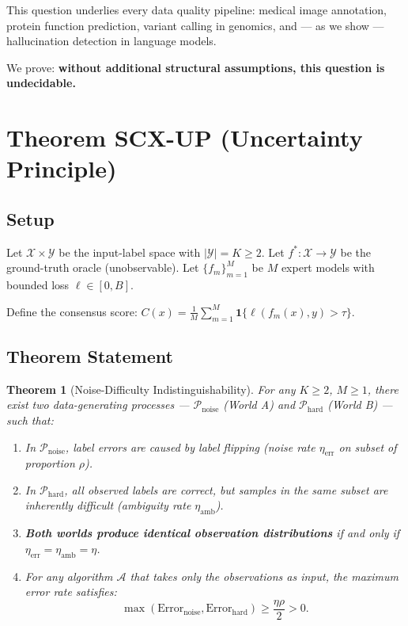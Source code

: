 \documentclass[12pt,a4paper]{ctexart}
\newtheorem{theorem}{Theorem}[section]
\theoremstyle{definition}
\theoremstyle{remark}
\begin{document}
This question underlies every data quality pipeline: medical image annotation, protein function prediction, variant calling in genomics, and — as we show — hallucination detection in language models.

We prove: \textbf{without additional structural assumptions, this question is undecidable.}

\section{Theorem SCX-UP (Uncertainty Principle)}

\subsection{Setup}

Let $\mathcal{X} \times \mathcal{Y}$ be the input-label space with $|\mathcal{Y}| = K \geq 2$. Let $f^*: \mathcal{X} \to \mathcal{Y}$ be the ground-truth oracle (unobservable). Let $\{f_m\}_{m=1}^M$ be $M$ expert models with bounded loss $\ell \in [0, B]$.

Define the consensus score: $C(x) = \frac{1}{M} \sum_{m=1}^M \mathbf{1}\{\ell(f_m(x), y) > \tau\}$.

\subsection{Theorem Statement}

\begin{theorem}[Noise-Difficulty Indistinguishability]
\label{thm:scx-up}
For any $K \geq 2$, $M \geq 1$, there exist two data-generating processes — $\mathcal{P}_{\text{noise}}$ (World A) and $\mathcal{P}_{\text{hard}}$ (World B) — such that:
\begin{enumerate}
\item In $\mathcal{P}_{\text{noise}}$, label errors are caused by label flipping (noise rate $\eta_{\text{err}}$ on subset of proportion $\rho$).
\item In $\mathcal{P}_{\text{hard}}$, all observed labels are correct, but samples in the same subset are inherently difficult (ambiguity rate $\eta_{\text{amb}}$).
\item \textbf{Both worlds produce identical observation distributions} if and only if $\eta_{\text{err}} = \eta_{\text{amb}} = \eta$.
\item For any algorithm $\mathcal{A}$ that takes only the observations as input, the maximum error rate satisfies:
\begin{equation}
\max(\text{Error}_{\text{noise}}, \text{Error}_{\text{hard}}) \geq \frac{\eta\rho}{2} > 0.
\end{equation}
\end{enumerate}
\end{theorem}
\end{document}
